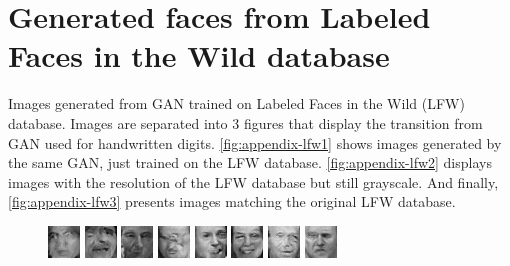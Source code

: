 \section*{Generated faces from Labeled Faces in the Wild database}
Images generated from GAN trained on Labeled Faces in the Wild (LFW) database. Images are separated into 3 figures that display the transition from GAN used for handwritten digits. \autoref{fig:appendix-lfw1} shows images generated by the same GAN, just trained on the LFW database. \autoref{fig:appendix-lfw2} displays images with the resolution of the LFW database but still grayscale. And finally, \autoref{fig:appendix-lfw3} presents images matching the original LFW database.

\begin{figure}[!h]
    \centerline{
        \includegraphics[scale=1]{figures/lfw/appendix1/lfw32x32bw_image0012.png}
        \includegraphics[scale=1]{figures/lfw/appendix1/lfw32x32bw_image0013.png}
        \includegraphics[scale=1]{figures/lfw/appendix1/lfw32x32bw_image0014.png}
        \includegraphics[scale=1]{figures/lfw/appendix1/lfw32x32bw_image0015.png}
        \includegraphics[scale=1]{figures/lfw/appendix1/lfw32x32bw_image0016.png}
        \includegraphics[scale=1]{figures/lfw/appendix1/lfw32x32bw_image0017.png}
        \includegraphics[scale=1]{figures/lfw/appendix1/lfw32x32bw_image0018.png}
        \includegraphics[scale=1]{figures/lfw/appendix1/lfw32x32bw_image0019.png}
}
\end{figure}

